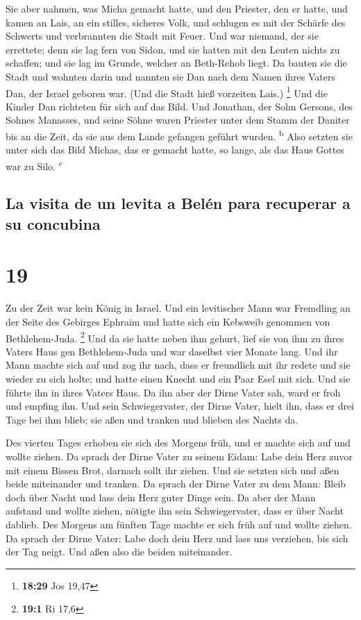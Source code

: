  Sie aber nahmen, was Micha gemacht hatte, und den
Priester, den er hatte, und kamen an Lais, an ein stilles, sicheres
Volk, und schlugen es mit der Schärfe des Schwerts und verbrannten die
Stadt mit Feuer.  Und war niemand, der sie errettete;
denn sie lag fern von Sidon, und sie hatten mit den Leuten nichts zu
schaffen; und sie lag im Grunde, welcher an Beth-Rehob liegt. Da bauten
sie die Stadt und wohnten darin  und nannten sie Dan nach
dem Namen ihres Vaters Dan, der Israel geboren war. (Und die Stadt hieß
vorzeiten Lais.) \footnote{\textbf{18:29} Jos 19,47}  Und
die Kinder Dan richteten für sich auf das Bild. Und Jonathan, der Sohn
Gersons, des Sohnes Manasses, und seine Söhne waren Priester unter dem
Stamm der Daniter bis an die Zeit, da sie aus dem Lande gefangen geführt
wurden. \textsuperscript{b}  Also setzten sie unter sich
das Bild Michas, das er gemacht hatte, so lange, als das Haus Gottes war
zu Silo. \textsuperscript{c}

\hypertarget{la-visita-de-un-levita-a-beluxe9n-para-recuperar-a-su-concubina}{%
\subsection{La visita de un levita a Belén para recuperar a su
concubina}\label{la-visita-de-un-levita-a-beluxe9n-para-recuperar-a-su-concubina}}

\hypertarget{section-18}{%
\section{19}\label{section-18}}

 Zu der Zeit war kein König in Israel. Und ein levitischer
Mann war Fremdling an der Seite des Gebirges Ephraim und hatte sich ein
Kebsweib genommen von Bethlehem-Juda. \footnote{\textbf{19:1} Ri 17,6}
 Und da sie hatte neben ihm gehurt, lief sie von ihm zu
ihres Vaters Haus gen Bethlehem-Juda und war daselbst vier Monate lang.
 Und ihr Mann machte sich auf und zog ihr nach, dass er
freundlich mit ihr redete und sie wieder zu sich holte; und hatte einen
Knecht und ein Paar Esel mit sich. Und sie führte ihn in ihres Vaters
Haus. Da ihn aber der Dirne Vater sah, ward er froh und empfing ihn.
 Und sein Schwiegervater, der Dirne Vater, hielt ihn, dass
er drei Tage bei ihm blieb; sie aßen und tranken und blieben des Nachts
da.

 Des vierten Tages erhoben sie sich des Morgens früh, und
er machte sich auf und wollte ziehen. Da sprach der Dirne Vater zu
seinem Eidam: Labe dein Herz zuvor mit einem Bissen Brot, darnach sollt
ihr ziehen.  Und sie setzten sich und aßen beide
miteinander und tranken. Da sprach der Dirne Vater zu dem Mann: Bleib
doch über Nacht und lass dein Herz guter Dinge sein.  Da
aber der Mann aufstand und wollte ziehen, nötigte ihn sein
Schwiegervater, dass er über Nacht dablieb.  Des Morgens
am fünften Tage machte er sich früh auf und wollte ziehen. Da sprach der
Dirne Vater: Labe doch dein Herz und lass uns verziehen, bis sich der
Tag neigt. Und aßen also die beiden miteinander.

